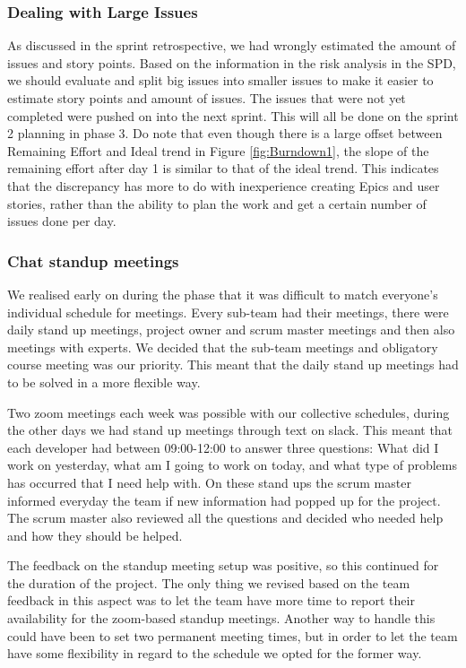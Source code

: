 \documentclass{article}
\begin{document}
\subsubsection{Dealing with Large Issues}
As discussed in the sprint retrospective, we had wrongly estimated the amount of issues and story points. Based on the information in the risk analysis in the SPD, we should evaluate and split big issues into smaller issues to make it easier to estimate story points and amount of issues. The issues that were not yet completed were pushed on into the next sprint. This will all be done on the sprint 2 planning in phase 3.  Do note that even though there is a large offset between Remaining Effort and Ideal trend in Figure \ref{fig:Burndown1}, the slope of the remaining effort after day 1 is similar to that of the ideal trend. This indicates that the discrepancy has more to do with inexperience creating Epics and user stories, rather than the ability to plan the work and get a certain number of issues done per day.

\subsubsection{Chat standup meetings}
We realised early on during the phase that it was difficult to match everyone's individual schedule for meetings. Every sub-team had their meetings, there were daily stand up meetings, project owner and scrum master meetings and then also meetings with experts. We decided that the sub-team meetings and obligatory course meeting was our priority. This meant that the daily stand up meetings had to be solved in a more flexible way. 

Two zoom meetings each week was possible with our collective schedules, during the other days we had stand up meetings through text on slack. This meant that each developer had between 09:00-12:00 to answer three questions: What did I work on yesterday, what am I going to work on today, and what type of problems has occurred that I need help with. On these stand ups the scrum master informed everyday the team if new information had popped up for the project. The scrum master also reviewed all the questions and decided who needed help and how they should be helped. 

The feedback on the standup meeting setup was positive, so this continued for the duration of the project. The only thing we revised based on the team feedback in this aspect was to let the team have more time to report their availability for the zoom-based standup meetings. Another way to handle this could have been to set two permanent meeting times, but in order to let the team have some flexibility in regard to the schedule we opted for the former way. 
\end{document}
